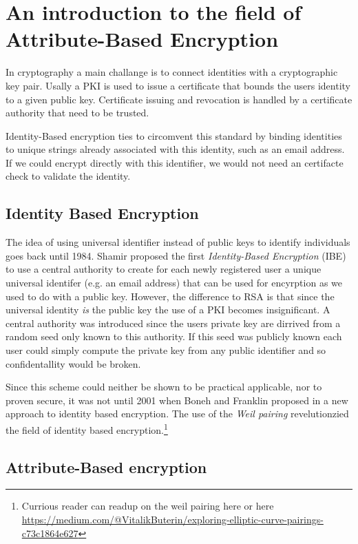 \section{An introduction to the field of Attribute-Based Encryption}
In cryptography a main challange is to connect identities with a cryptographic key pair. Usally a PKI is used to issue a certificate that bounds the users identity to a given public key. Certificate issuing and revocation is handled by a certificate authority that need to be trusted. 

Identity-Based encryption ties to circomvent this standard by binding identities to unique strings already associated with this identity, such as an email address. If we could encrypt directly with this identifier, we would not need an certifacte check to validate the identity. 

\subsection{Identity Based Encryption}
The idea of using universal identifier instead of public keys to identify individuals goes back until 1984. Shamir proposed the first \textit{Identity-Based Encryption} (IBE) \cite{shamir1984identity} to use a central authority to create for each newly registered user a unique universal identifer (e.g. an email address) that can be used for encyrption as we used to do with a public key. However, the difference to RSA is that since the universal identity \textit{is} the public key the use of a PKI becomes insignificant. A central authority was introduced since the users private key are dirrived from a random seed only known to this authority. If this seed was publicly known each user could simply compute the private key from any public identifier and so confidentallity would be broken. 

Since this scheme could neither be shown to be practical applicable, nor to proven secure, it was not until 2001 when Boneh and Franklin proposed in \cite{boneh2001identity} a new approach to identity based encryption. The use of the \textit{Weil pairing} revelutionzied the field of identity based encryption.\footnote{Currious reader can readup on the weil pairing here \cite{Miller2004} \cite{galbraith2008pairings} or here \url{https://medium.com/@VitalikButerin/exploring-elliptic-curve-pairings-c73c1864e627}} 

\subsection{Attribute-Based encryption}

